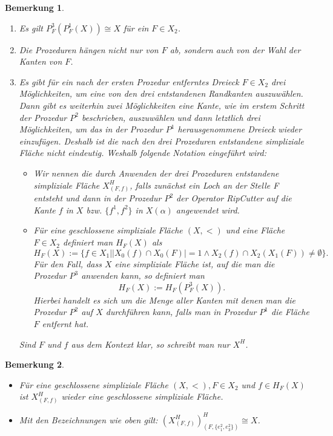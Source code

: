 \documentclass[12pt,titlepage]{article}
\newtheorem{bemerkung}{Bemerkung}[section]
\begin{document}
\begin{bemerkung}
\begin{enumerate}
\item Es gilt $P^3_F(P^1_F(X))\cong X$ für ein $F \in X_2 $.
\item Die Prozeduren hängen nicht nur von $F$ ab, sondern auch von der Wahl der Kanten von $F$.
\item Es gibt für ein nach der ersten Prozedur entferntes Dreieck $F \in X_{2}$ drei Möglichkeiten, um eine von den drei entstandenen Randkanten auszuwählen. Dann gibt es weiterhin zwei Möglichkeiten eine Kante, wie im erstem Schritt der Prozedur $P^2$ beschrieben, auszuwählen und dann letztlich drei Möglichkeiten, um das in der Prozedur $P^1$ herausgenommene Dreieck wieder einzufügen. Deshalb ist die nach den drei Prozeduren entstandene simpliziale Fläche nicht eindeutig. Weshalb folgende Notation eingeführt wird: \\
\begin{itemize}
\item Wir nennen die durch Anwenden der drei Prozeduren entstandene simpliziale Fläche $X^{H}_{(F,f)}$, falls zunächst ein \emph{Loch an der Stelle F} entsteht und dann in der Prozedur $P^2$ der Operator \emph{RipCutter} auf die Kante $f$ in $X$ bzw. $\{f^1,f^2\}$ in $X(\alpha)$ angewendet wird. 
\item Für eine geschlossene simpliziale Fläche $(X,<)$ und eine Fläche $F \in X_2$ definiert man \emph{$H_F(X)$} als 
\[
H_F(X):=\{f \in X_1\mid \vert X_{0}(f) \cap X_{0}(F)\vert = 1 \land X_2(f) \cap X_2(X_1(F))\neq \emptyset\} .
\] 
Für den Fall, dass $X$ eine simpliziale Fläche ist, auf die man die Prozedur $P^3$ anwenden kann, so definiert man
\[
H_F(X):=H_F(P^3_F(X)).
\]
Hierbei handelt es sich um die Menge aller Kanten mit denen man die Prozedur $P^2$ auf $X$
durchführen kann, falls man in Prozedur $P^1$ die Fläche $F$ entfernt hat.
 \end{itemize}
 Sind $F$ und $f$ aus dem Kontext klar, so schreibt man nur $X^H$.
 \end{enumerate}
\end{bemerkung}
\begin{bemerkung}
\begin{itemize}
\item Für eine geschlossene simpliziale Fläche $(X,<),F \in X_2$ und $f \in H_F(X)$ ist $X^H_{(F,f)}$ wieder eine geschlossene simpliziale Fläche.
\item Mit den Bezeichnungen wie oben gilt: $(X^H_{(F,f)})^H_{(F,\{e_1^2,e_3^2\})}\cong X$.


\end{itemize}
\end{bemerkung}
\end{document}
